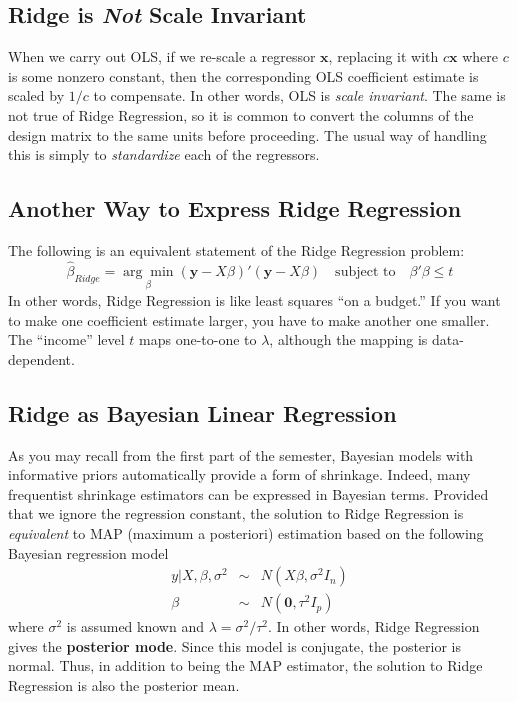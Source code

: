 \documentclass[12pt]{article}
\theoremstyle{definition}
\begin{document}
\subsection{Ridge is \emph{Not} Scale Invariant} When we carry out OLS, if we re-scale a regressor $\mathbf{x}$, replacing it with $c \mathbf{x}$ where $c$ is some nonzero constant, then the corresponding OLS coefficient estimate is scaled by $1/c$ to compensate. In other words, OLS is \emph{scale invariant}. The same is not true of Ridge Regression, so it is common to convert the columns of the design matrix to the same units before proceeding. The usual way of handling this is simply to \emph{standardize} each of the regressors.

\subsection{Another Way to Express Ridge Regression}
The following is an equivalent statement of the Ridge Regression problem:
$$\widehat{\beta}_{Ridge} = \underset{\beta}{\arg \min}(\mathbf{y} - X\beta)' (\mathbf{y} - X\beta) \quad \mbox{subject to} \quad \beta'\beta \leq t$$
In other words, Ridge Regression is like least squares ``on a budget.'' If you want to make one coefficient estimate larger, you have to make another one smaller. The ``income'' level $t$ maps one-to-one to $\lambda$, although the mapping is data-dependent.

\subsection{Ridge as Bayesian Linear Regression}
As you may recall from the first part of the semester, Bayesian models with informative priors automatically provide a form of shrinkage. Indeed, many frequentist shrinkage estimators can be expressed in Bayesian terms. Provided that we ignore the regression constant, the solution to Ridge Regression is \emph{equivalent} to MAP (maximum a posteriori) estimation based on the following  Bayesian regression model
	\begin{eqnarray*}
		y|X, \beta, \sigma^2 &\sim& N(X\beta,\sigma^2 I_n) \\
		\beta &\sim& N(\mathbf{0}, \tau^2 I_p)
	\end{eqnarray*}
where $\sigma^2$ is assumed known and $\lambda = \sigma^2/\tau^2$. In other words, Ridge Regression gives the \textbf{posterior mode}. Since this model is conjugate, the posterior is normal. Thus, in addition to being the MAP estimator, the solution to Ridge Regression is also the posterior mean.
\end{document}
